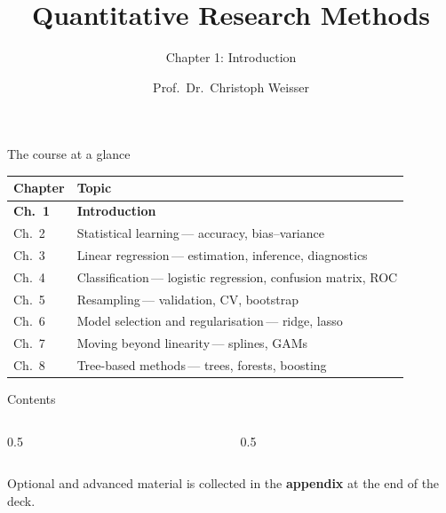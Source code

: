\documentclass[aspectratio=169,11pt]{beamer}
\title{Quantitative Research Methods}
\subtitle{Chapter 1: Introduction}
\author{Prof.\ Dr.\ Christoph Weisser}
\date{}\graphicspath{{images/}}
\begin{document}
\begin{frame}[plain]\titlepage\end{frame}

\begin{frame}{The course at a glance}
  \vspace{-1.5mm}
  \begin{center}
  \scriptsize
  \setlength{\tabcolsep}{5pt}
  \renewcommand{\arraystretch}{1.30}
  \begin{tabular}{@{\hspace{2pt}}l >{\raggedright\arraybackslash}p{}@{\hspace{2pt}}}
    \toprule
    \textbf{Chapter} & \textbf{Topic} \\
    \midrule
    \rowcolor{accent!18} \textbf{Ch.\ 1} & \textbf{Introduction} \\
    \rowcolor{black!3} {\color{accent}Ch.\ 2} & Statistical learning\,{\color{black!45}--- accuracy, bias--variance} \\
     {\color{accent}Ch.\ 3} & Linear regression\,{\color{black!45}--- estimation, inference, diagnostics} \\
    \rowcolor{black!3} {\color{accent}Ch.\ 4} & Classification\,{\color{black!45}--- logistic regression, confusion matrix, ROC} \\
     {\color{accent}Ch.\ 5} & Resampling\,{\color{black!45}--- validation, CV, bootstrap} \\
    \rowcolor{black!3} {\color{accent}Ch.\ 6} & Model selection and regularisation\,{\color{black!45}--- ridge, lasso} \\
     {\color{accent}Ch.\ 7} & Moving beyond linearity\,{\color{black!45}--- splines, GAMs} \\
    \rowcolor{black!3} {\color{accent}Ch.\ 8} & Tree-based methods\,{\color{black!45}--- trees, forests, boosting} \\
    \bottomrule
  \end{tabular}
  \end{center}
\end{frame}


\begin{frame}{Contents}
  \begin{columns}[t]
    \begin{column}{0.5\textwidth}
      \tableofcontents[hideallsubsections,sections={1-4}]
    \end{column}
    \begin{column}{0.5\textwidth}
      \tableofcontents[hideallsubsections,sections={5-8}]
    \end{column}
  \end{columns}
  \vfill
  {\tiny Optional and advanced material is collected in the \textbf{appendix} at the end of the deck.}
\end{frame}
\end{document}
